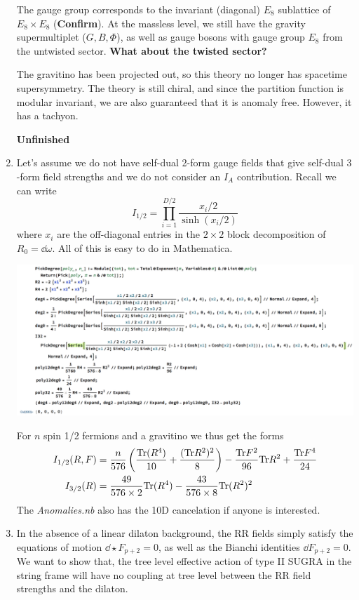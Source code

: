 \documentclass[11pt, class=article, crop=false]{standalone}
\begin{document}
\begin{enumerate}
	The gauge group corresponds to the invariant (diagonal) $E_8$ sublattice of $E_8 \times E_8$ (\textbf{Confirm}). At the massless level, we still have the gravity supermultiplet ($G, B, \Phi$), as well as gauge bosons with gauge group $E_8$ from the untwisted sector. \textbf{What about the twisted sector?}
	
	The gravitino has been projected out, so this theory no longer has spacetime supersymmetry. 
	The theory is still chiral, and since the partition function is modular invariant, we are also guaranteed that it is anomaly free. However, it has a tachyon. 

	\textbf{Unfinished}
	
	\item Let's assume we do not have self-dual 2-form gauge fields that give self-dual $3$-form field strengths and we do not consider an $I_A$ contribution. Recall we can write
	\[
		I_{1/2} = \prod_{i=1}^{D/2} \frac{x_i/2}{\sinh(x_i/2)}
	\]
	where $x_i$ are the off-diagonal entries in the $2\times2$ block decomposition of $R_0 = \dd \omega$. All of this is easy to do in Mathematica. 
	\begin{center}
		\includegraphics[scale=0.45]{"Figures/6D Anomaly"}
	\end{center}
	For $n$ spin 1/2 fermions and a gravitino we thus get the forms
	\[
	\begin{aligned}
		I_{1/2}(R, F) &= \frac{n}{576} \left(\frac{\mathrm{Tr} (R^4)}{10} + \frac{(\mathrm{Tr} R^2)^2}{8} \right) - \frac{\mathrm{Tr} F^2}{96} \mathrm{Tr} R^2 + \frac{\mathrm{Tr} F^4}{24}\\
		I_{3/2}(R) &= \frac{49}{576 \times 2} \mathrm{Tr} (R^4) - \frac{43}{576 \times 8} \mathrm{Tr}(R^2)^2
	\end{aligned}
	\]
	The \emph{Anomalies.nb} also has the 10D cancelation if anyone is interested.
	
	\item In the absence of a linear dilaton background, the RR fields simply satisfy the equations of motion $\dd \star F_{p+2} = 0$, as well as the Bianchi identities $\dd F_{p+2} = 0$. We want to show that, the tree level effective action of type II SUGRA in the string frame will have no coupling at tree level between the RR field strengths and the dilaton.
	

\end{enumerate}
\end{document}
